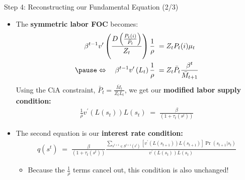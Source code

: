 \documentclass[10pt,c,aspectratio=1610,handout]{beamer}
\begin{document}
\begin{frame}{Step 4: Reconstructing our Fundamental Equation (2/3)}%
  \begin{itemize}%
    \item[$\blacktriangleright$] The \textbf{symmetric labor FOC} becomes:%
    \begin{align*}%
      \beta^{t-1} v^{\prime} \left( \frac{ D \left( \frac{P_{t}(i)}{\bar{P}_{t}} \right)}{Z_{t}} \right) \frac{1}{\rho} \; = & \; Z_{t} P_{t}(i) \mu _{t}\\%
      \pause%
      \Leftrightarrow \quad \beta^{t-1} v^{\prime} \left( L_t \right) \frac{1}{\rho} \; = & \; Z_{t} \bar{P}_{t} \frac{\beta^t}{\bar M_{t+1}}%
    \end{align*}%
    \pause%
    Using the CiA constraint, $\bar{P}_t = \frac{\bar{M}_t}{Z_t L_t}$, we get our \textbf{modified labor supply condition:}%
    \begin{align}%
      \frac{1}{\rho} v^{\prime} (L(s_{t})) L(s_{t}) \; = \; \frac{\beta}{(1+\tau_{t}(s^{t}))}%
    \end{align}%
    \pause%
    \item[$\blacktriangleright$] The second equation is our \textbf{interest rate condition:}%
    \begin{align*}%
      q(s^{t}) \; = \; \frac{\beta}{(1+\tau_{t}(s^{t}))} \frac{\sum_{s^{t+1}\in S^{t+1}(s^{t})}\left[ v^{\prime}(L(s_{t+1})) L(s_{t+1}) \right] \Pr(s_{t+1}|s_{t})}{v^{\prime}(L(s_{t}))L(s_{t})}%
    \end{align*}%
    \begin{itemize}%
      \item[$\rightarrow$] Because the $\frac{1}{\rho}$ terms cancel out, this condition is also unchanged!%
    \end{itemize}%
  \end{itemize}%
\end{frame}%
\end{document}
